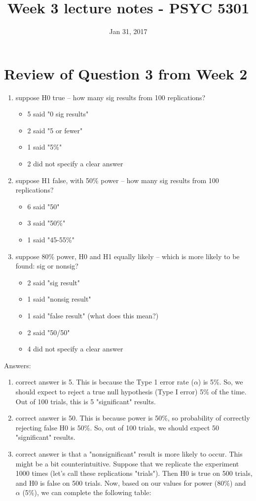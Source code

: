 \documentclass[11pt]{article}
\date{Jan 31, 2017}
\title{Week 3 lecture notes - PSYC 5301}
\begin{document}
\maketitle

\section*{Review of Question 3 from Week 2}
\label{sec-1}
\begin{enumerate}
\item suppose H0 true -- how many sig results from 100 replications?
\begin{itemize}
\item 5 said "0 sig results"
\item 2 said "5 or fewer"
\item 1 said "5\%"
\item 2 did not specify a clear answer
\end{itemize}

\item suppose H1 false, with 50\% power -- how many sig results from 100 replications?
\begin{itemize}
\item 6 said "50"
\item 3 said "50\%"
\item 1 said "45-55\%"
\end{itemize}

\item suppose 80\% power, H0 and H1 equally likely -- which is more likely to be found: sig or nonsig?
\begin{itemize}
\item 2 said "sig result"
\item 1 said "nonsig result"
\item 1 said "false result" (what does this mean?)
\item 2 said "50/50"
\item 4 did not specify a clear answer
\end{itemize}
\end{enumerate}

Answers:

\begin{enumerate}
\item correct answer is 5.  This is because the Type 1 error rate ($\alpha$) is 5\%.  So, we should expect to reject a true null hypothesis (Type I error) 5\% of the time.  Out of 100 trials, this is 5 "significant" results.

\item correct answer is 50.  This is because power is 50\%, so probability of correctly rejecting false H0 is 50\%.  So, out of 100 trials, we should expect 50 "significant" results.

\item correct answer is that a "nonsignificant" result is more likely to occur.  This might be a bit counterintuitive.  Suppose that we replicate the experiment 1000 times (let's call these replications "trials").  Then H0 is true on 500 trials, and H0 is false on 500 trials.  Now, based on our values for power (80\%) and $\alpha$ (5\%), we can complete the following table:
\end{enumerate}
\end{document}
